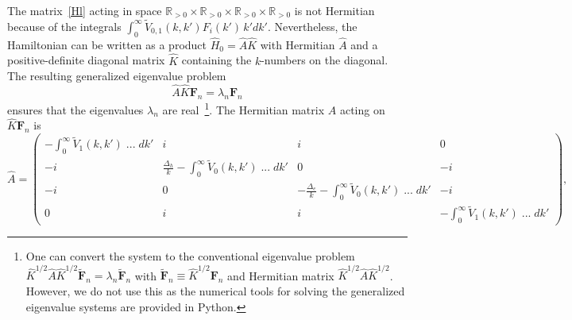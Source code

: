 \documentclass[
aps,
prl,
groupedaddress,
superscriptaddress,
floatfix,
notitlepage
]{revtex4-1}
\begin{document}
The matrix~\eqref{Hl} acting in space $\mathbb{R}_{>0}\times \mathbb{R}_{>0}\times \mathbb{R}_{>0} \times \mathbb{R}_{>0}$ is not Hermitian because of the integrals $\int_0^\infty \tilde{V}_{0,1}(k,k') F_i(k')\, k'dk'$. Nevertheless, the Hamiltonian can be written as a product
$
\hat{H}_0=\hat{A}\hat{K}
$
with Hermitian $\hat{A}$ and a positive-definite diagonal matrix $\hat{K}$ containing the $k$-numbers on the diagonal. 
The resulting generalized eigenvalue problem
$$
\hat{A}\hat{K} \mathbf{F}_n = \lambda_n \mathbf{F}_n
$$
ensures that 
the eigenvalues $\lambda_n$ are real~\footnote{One can convert the system to the conventional eigenvalue problem 
$\hat{K}^{1/2}\hat{A}\hat{K}^{1/2} \tilde{\mathbf{F}}_n = \lambda_n \tilde{\mathbf{F}}_n$ with $\tilde{\mathbf{F}}_n\equiv \hat{K}^{1/2}\mathbf{F}_n$ and Hermitian matrix $\hat{K}^{1/2}\hat{A}\hat{K}^{1/2}$. However, we do not use this as the numerical tools for solving the generalized eigenvalue systems are provided in Python.}. The Hermitian matrix $A$ acting on  $\hat{K} \mathbf{F}_n$ is
\setlength\arraycolsep{7pt}
\renewcommand*{\arraystretch}{2}
\begin{equation}
\hat{A} =
\begin{pmatrix}
-\int_0^\infty \tilde{V}_1(k,k') \;...\; dk' &  i & i & 0 \\
-i & \frac{\Delta_h}{k}-\int_0^\infty \tilde{V}_0(k,k') \;...\; dk' & 0 & -i \\
-i  & 0 & -\frac{\Delta_e}{k}-\int_0^\infty \tilde{V}_0(k,k') \;...\; dk' & -i \\
0 & i & i & -\int_0^\infty \tilde{V}_1(k,k') \;...\; dk'
\end{pmatrix},
\label{Amatrix}
\end{equation}

\end{document}
